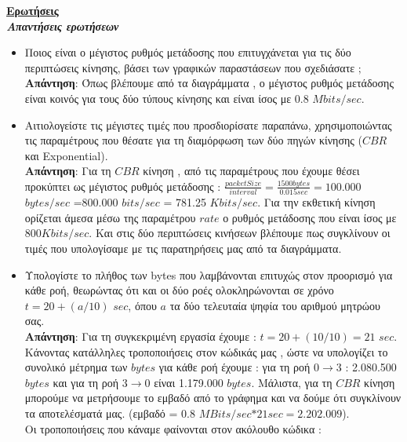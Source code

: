 \documentclass{article}%
\begin{document}
\textbf{\underline{Ερωτήσεις}} \\
\textsl{\textbf{{Απαντήσεις ερωτήσεων}}}
\begin{itemize}
	\item Ποιος είναι ο μέγιστος ρυθμός μετάδοσης που επιτυγχάνεται για τις δύο περιπτώσεις
κίνησης, βάσει των γραφικών παραστάσεων που σχεδιάσατε $;$\\
	\textbf{Απάντηση}: Όπως βλέπουμε από τα διαγράμματα , ο μέγιστος ρυθμός μετάδοσης είναι κοινός για τους δύο τύπους κίνησης και είναι ίσος με 0.8 $Mbits/sec$.
	\item Αιτιολογείστε τις μέγιστες τιμές που προσδιορίσατε παραπάνω, χρησιμοποιώντας τις
παραμέτρους που θέσατε για τη διαμόρφωση των δύο πηγών κίνησης ($CBR$ και
\textlatin{Exponential}). \\
	\textbf{Απάντηση}: Για τη $CBR$ κίνηση , από τις παραμέτρους που έχουμε θέσει προκύπτει ως μέγιστος ρυθμός μετάδοσης : $ \frac{packetSize}{interval}= \frac{1500 bytes}{0.015 sec}=100.000$ $bytes/sec$ =800.000 $bits/sec$ = 781.25 $Kbits/sec$. Για την εκθετική κίνηση ορίζεται άμεσα μέσω της παραμέτρου $rate$ ο ρυθμός μετάδοσης που είναι ίσος με $800Kbits/sec$. Και στις δύο περιπτώσεις κινήσεων βλέπουμε πως συγκλίνουν οι τιμές που υπολογίσαμε με τις παρατηρήσεις μας από τα διαγράμματα.
	\item Υπολογίστε το πλήθος των \textlatin{bytes} που λαμβάνονται επιτυχώς στον προορισμό για κάθε
ροή, θεωρώντας ότι και οι δύο ροές ολοκληρώνονται σε χρόνο $t=20+(a/10)$ $sec$, όπου $a$ τα
δύο τελευταία ψηφία του αριθμού μητρώου σας. \\
	\textbf{Απάντηση}: Για τη συγκεκριμένη εργασία έχουμε : $t=20+(10/10)=21$ $sec$. Κάνοντας κατάλληλες τροποποιήσεις στον κώδικάς μας , ώστε να υπολογίζει το συνολικό μέτρημα των $bytes$ για κάθε ροή έχουμε : για τη ροή $0\rightarrow 3$ : 2.080.500 $bytes$  και για τη ροή $3\rightarrow 0$ είναι 1.179.000 $bytes$. Μάλιστα, για τη $CBR$ κίνηση μπορούμε να μετρήσουμε το εμβαδό από το γράφημα και να δούμε ότι συγκλίνουν τα αποτελέσματά μας. (εμβαδό = $0.8$ $MBits/sec$$*21 sec = 2.202.009$). \\
Οι τροποποιήσεις που κάναμε φαίνονται στον ακόλουθο κώδικα :



\end{itemize}
\end{document}
